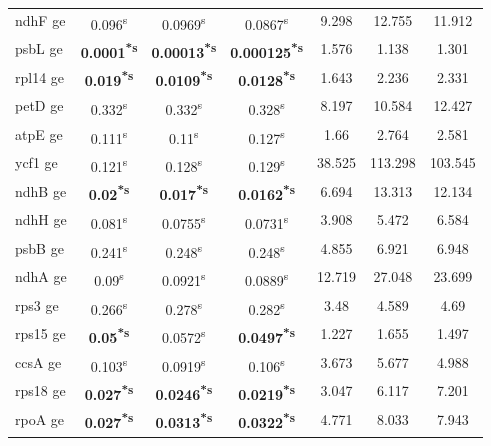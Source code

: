 \documentclass[a4paper]{article}
\begin{document}
\begin{longtable}{l|c|c|c|c|c|c}
ndhF ge&0.096\textsuperscript{s}&0.0969\textsuperscript{s}&0.0867\textsuperscript{s}&9.298&12.755&11.912\\
psbL ge&\textbf{0.0001\textsuperscript{*}\textsuperscript{s}}&\textbf{0.00013\textsuperscript{*}\textsuperscript{s}}&\textbf{0.000125\textsuperscript{*}\textsuperscript{s}}&1.576&1.138&1.301\\
rpl14 ge&\textbf{0.019\textsuperscript{*}\textsuperscript{s}}&\textbf{0.0109\textsuperscript{*}\textsuperscript{s}}&\textbf{0.0128\textsuperscript{*}\textsuperscript{s}}&1.643&2.236&2.331\\
petD ge&0.332\textsuperscript{s}&0.332\textsuperscript{s}&0.328\textsuperscript{s}&8.197&10.584&12.427\\
atpE ge&0.111\textsuperscript{s}&0.11\textsuperscript{s}&0.127\textsuperscript{s}&1.66&2.764&2.581\\
ycf1 ge&0.121\textsuperscript{s}&0.128\textsuperscript{s}&0.129\textsuperscript{s}&38.525&113.298&103.545\\
ndhB ge&\textbf{0.02\textsuperscript{*}\textsuperscript{s}}&\textbf{0.017\textsuperscript{*}\textsuperscript{s}}&\textbf{0.0162\textsuperscript{*}\textsuperscript{s}}&6.694&13.313&12.134\\
ndhH ge&0.081\textsuperscript{s}&0.0755\textsuperscript{s}&0.0731\textsuperscript{s}&3.908&5.472&6.584\\
psbB ge&0.241\textsuperscript{s}&0.248\textsuperscript{s}&0.248\textsuperscript{s}&4.855&6.921&6.948\\
ndhA ge&0.09\textsuperscript{s}&0.0921\textsuperscript{s}&0.0889\textsuperscript{s}&12.719&27.048&23.699\\
rps3 ge&0.266\textsuperscript{s}&0.278\textsuperscript{s}&0.282\textsuperscript{s}&3.48&4.589&4.69\\
rps15 ge&\textbf{0.05\textsuperscript{*}\textsuperscript{s}}&0.0572\textsuperscript{s}&\textbf{0.0497\textsuperscript{*}\textsuperscript{s}}&1.227&1.655&1.497\\
ccsA ge&0.103\textsuperscript{s}&0.0919\textsuperscript{s}&0.106\textsuperscript{s}&3.673&5.677&4.988\\
rps18 ge&\textbf{0.027\textsuperscript{*}\textsuperscript{s}}&\textbf{0.0246\textsuperscript{*}\textsuperscript{s}}&\textbf{0.0219\textsuperscript{*}\textsuperscript{s}}&3.047&6.117&7.201\\
rpoA ge&\textbf{0.027\textsuperscript{*}\textsuperscript{s}}&\textbf{0.0313\textsuperscript{*}\textsuperscript{s}}&\textbf{0.0322\textsuperscript{*}\textsuperscript{s}}&4.771&8.033&7.943\\

\end{longtable}
\end{document}
